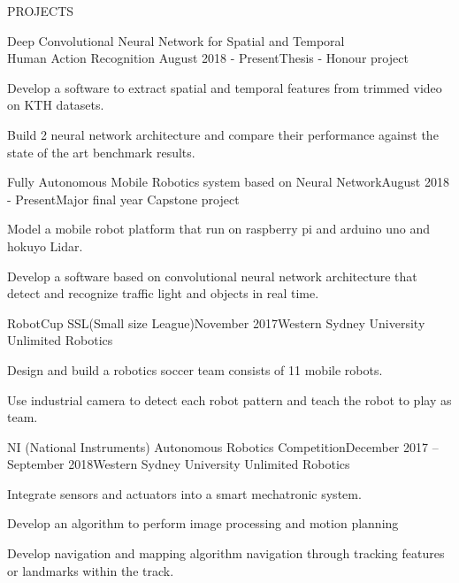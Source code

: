 \documentclass{resume} %
\begin{document}

\begin{rSection}{PROJECTS}

\begin{rSubsection}{Deep Convolutional Neural Network for Spatial and Temporal 
\\Human Action Recognition} {August 2018 - Present}{Thesis - Honour project}{}

\item Develop a software to extract spatial and temporal features from trimmed video on KTH datasets.
\item Build 2 neural network architecture and compare their performance against the state of the art benchmark results.
\end{rSubsection}  


\begin{rSubsection}{Fully Autonomous Mobile Robotics system based on Neural Network}{August 2018 - Present}{Major final year Capstone project}{} 
\item Model a mobile robot platform that run on raspberry pi and arduino uno and hokuyo Lidar.
\item Develop a software based on convolutional neural network architecture that detect and recognize traffic light and objects in real time.   

\end{rSubsection}



\begin{rSubsection}{RobotCup SSL(Small size League)}{November 2017}{Western Sydney University Unlimited Robotics}

\item Design and build a robotics soccer team consists of 11 mobile robots.
\item Use industrial camera to detect each robot pattern and teach the robot to play as team.    

\end{rSubsection}


\begin{rSubsection}{NI (National Instruments) Autonomous Robotics Competition}{December 2017 – September 2018}{Western Sydney University Unlimited Robotics}{}    

\item Integrate sensors and actuators into a smart mechatronic system. 
\item Develop an algorithm to perform image processing and motion planning
\item Develop navigation and mapping algorithm navigation through tracking features or landmarks within the track.

\end{rSubsection} 

\end{rSection} 
\end{document}
